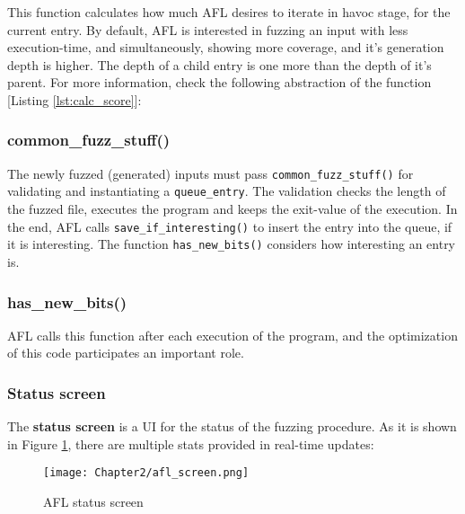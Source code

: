 This function calculates how much AFL desires to iterate in havoc stage, for the current entry. By default, AFL is interested in fuzzing an input with less execution-time, and simultaneously, showing more coverage, and it's generation depth is higher. The depth of a child entry is one more than the depth of it's parent. For more information, check the following abstraction of the function [Listing \ref{lst:calc_score}]: 



\subsubsection*{common\_fuzz\_stuff()}
The newly fuzzed (generated) inputs must pass \texttt{common\_fuzz\_stuff()} for validating and instantiating a \texttt{queue\_entry}. The validation checks the length of the fuzzed file, executes the program and keeps the exit-value of the execution. In the end, AFL calls \texttt{save\_if\_interesting()} to insert the entry into the queue, if it is interesting. The function \texttt{has\_new\_bits()} considers how interesting an entry is.



\subsubsection*{has\_new\_bits()}
AFL calls this function after each execution of the program, and the optimization of this code participates an important role.



\subsubsection*{Status screen}

The \textbf{status screen} is a UI for the status of the fuzzing procedure. As it is shown in Figure \ref{fig:status_screen}, there are multiple stats provided in real-time updates:
    
\begin{figure}[!b]
    \texttt{[image: Chapter2/afl\_screen.png]}
    \centering
    \caption{AFL status screen}
    \label{fig:status_screen}
\end{figure} 

